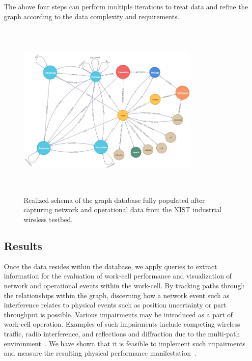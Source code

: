 The above four steps can perform multiple iterations to treat data and refine the graph according to the data complexity and requirements.  
%
\begin{figure}
	\centering
	\includegraphics[width=0.8\textwidth,height=3.5in]{chapter-gdb-appl/figures/database/graph_schema_updated_2.png}
	\caption{Realized schema of the graph database fully populated after capturing network and operational data from the NIST industrial wireless testbed. \vspace{-0.2in}}
	\label{gdbappl:fig:real-schema}
\end{figure}

\subsection{Results} \label{gdbappl:sec:results}

Once the data resides within the database, we apply queries to extract information for the evaluation of work-cell performance and visualization of network and operational events within the work-cell. By tracking paths through the relationships within the graph, discerning how a network event such as interference relates to physical events such as position uncertainty or part throughput is possible. Various impairments may be introduced as a part of work-cell operation.  Examples of such impairments include competing wireless traffic, radio interference, and reflections and diffraction due to the multi-path environment~\cite{Candell2017.NIST1951}. We have shown that it is feasible to implement such impairments and measure the resulting physical performance manifestation~\cite{Liu2019vancouver}. 


